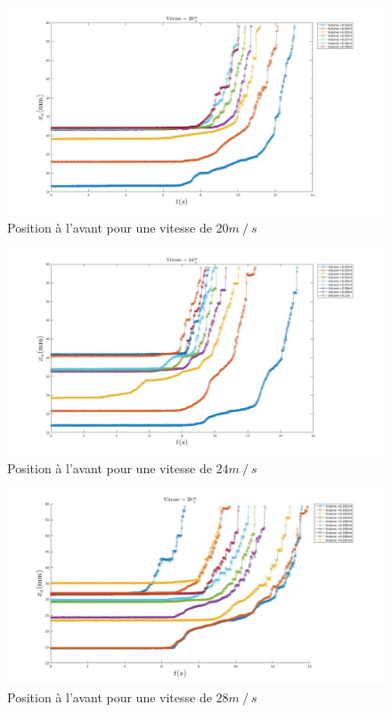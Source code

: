 \documentclass[french]{article}
\begin{document}
\begin{figure}[h]
	\centering
	\includegraphics[width = \linewidth]{./image/v=20xa.jpg}
	\caption{Position à l'avant pour une vitesse de $20m\mathbin{/}s$}
\end{figure}
\begin{figure}[h]
	\centering
	\includegraphics[width = \linewidth]{./image/v=24xa.jpg}
	\caption{Position à l'avant pour une vitesse de $24m\mathbin{/}s$}
\end{figure}
\begin{figure}[h]
	\centering
	\includegraphics[width = \linewidth]{./image/v=28xa.jpg}
	\caption{Position à l'avant pour une vitesse de $28m\mathbin{/}s$}
\end{figure}
\end{document}
